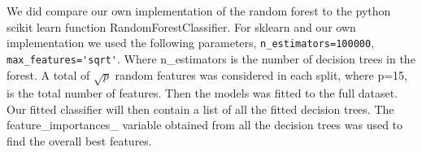 









We did compare our own implementation of the random forest to the python
scikit learn function RandomForestClassifier. For sklearn and our own
implementation we used the following parameters, \verb|n_estimators=100000|,
\verb|max_features='sqrt'|. Where n\_estimators is the number of decision trees
in the forest. A total of $\sqrt{p} $ random features was considered in each
split, where p=15, is the total number of features. Then the models was fitted
to the full dataset. Our fitted classifier will then contain a list of all the
fitted decision trees. The feature\_importances\_ variable obtained from all the
decision trees was used to find the overall best features.  

